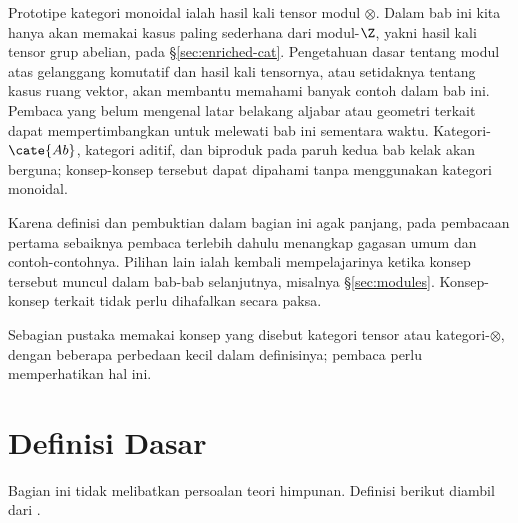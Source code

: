 \begin{wenxintishi}
	Prototipe kategori monoidal ialah hasil kali tensor modul $\otimes$. Dalam bab ini kita hanya akan memakai kasus paling sederhana dari modul-$\Z$, yakni hasil kali tensor grup abelian, pada \S\ref{sec:enriched-cat}. Pengetahuan dasar tentang modul atas gelanggang komutatif dan hasil kali tensornya, atau setidaknya tentang kasus ruang vektor, akan membantu memahami banyak contoh dalam bab ini. Pembaca yang belum mengenal latar belakang aljabar atau geometri terkait dapat mempertimbangkan untuk melewati bab ini sementara waktu. Kategori-$\cate{Ab}$, kategori aditif, dan biproduk pada paruh kedua bab kelak akan berguna; konsep-konsep tersebut dapat dipahami tanpa menggunakan kategori monoidal.

	Karena definisi dan pembuktian dalam bagian ini agak panjang, pada pembacaan pertama sebaiknya pembaca terlebih dahulu menangkap gagasan umum dan contoh-contohnya. Pilihan lain ialah kembali mempelajarinya ketika konsep tersebut muncul dalam bab-bab selanjutnya, misalnya \S\ref{sec:modules}. Konsep-konsep terkait tidak perlu dihafalkan secara paksa.

	Sebagian pustaka memakai konsep yang disebut kategori tensor atau kategori-$\otimes$, dengan beberapa perbedaan kecil dalam definisinya; pembaca perlu memperhatikan hal ini. 
\end{wenxintishi}

\section{Definisi Dasar}\label{sec:monoidal-cat-def}
Bagian ini tidak melibatkan persoalan teori himpunan. Definisi berikut diambil dari \cite[\S 2.1]{EGNO15}.

